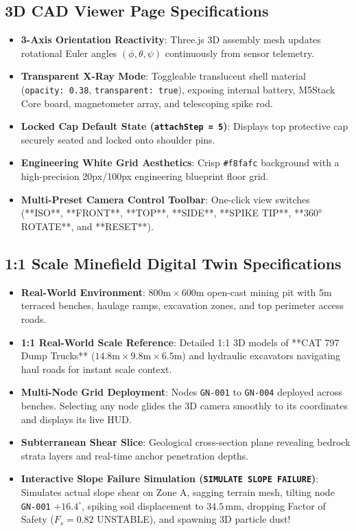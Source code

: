 \documentclass[11pt,a4paper]{article}
\begin{document}
\subsection{3D CAD Viewer Page Specifications}
\begin{itemize}[leftmargin=*]
    \item \textbf{3-Axis Orientation Reactivity}: Three.js 3D assembly mesh updates rotational Euler angles $(\phi, \theta, \psi)$ continuously from sensor telemetry.
    \item \textbf{Transparent X-Ray Mode}: Toggleable translucent shell material (\texttt{opacity: 0.38}, \texttt{transparent: true}), exposing internal battery, M5Stack Core board, magnetometer array, and telescoping spike rod.
    \item \textbf{Locked Cap Default State (\texttt{attachStep = 5})}: Displays top protective cap securely seated and locked onto shoulder pins.
    \item \textbf{Engineering White Grid Aesthetics}: Crisp \texttt{\#f8fafc} background with a high-precision 20px/100px engineering blueprint floor grid.
    \item \textbf{Multi-Preset Camera Control Toolbar}: One-click view switches (**ISO**, **FRONT**, **TOP**, **SIDE**, **SPIKE TIP**, **360° ROTATE**, and **RESET**).
\end{itemize}

\subsection{1:1 Scale Minefield Digital Twin Specifications}
\begin{itemize}[leftmargin=*]
    \item \textbf{Real-World Environment}: $800\text{m} \times 600\text{m}$ open-cast mining pit with 5m terraced benches, haulage ramps, excavation zones, and top perimeter access roads.
    \item \textbf{1:1 Real-World Scale Reference}: Detailed 1:1 3D models of **CAT 797 Dump Trucks** ($14.8\text{m} \times 9.8\text{m} \times 6.5\text{m}$) and hydraulic excavators navigating haul roads for instant scale context.
    \item \textbf{Multi-Node Grid Deployment}: Nodes \texttt{GN-001} to \texttt{GN-004} deployed across benches. Selecting any node glides the 3D camera smoothly to its coordinates and displays its live HUD.
    \item \textbf{Subterranean Shear Slice}: Geological cross-section plane revealing bedrock strata layers and real-time anchor penetration depths.
    \item \textbf{Interactive Slope Failure Simulation (\texttt{SIMULATE SLOPE FAILURE})}: Simulates actual slope shear on Zone A, sagging terrain mesh, tilting node \texttt{GN-001} $+16.4^\circ$, spiking soil displacement to $34.5\,\text{mm}$, dropping Factor of Safety ($F_s = 0.82$ UNSTABLE), and spawning 3D particle dust!
\end{itemize}
\end{document}
